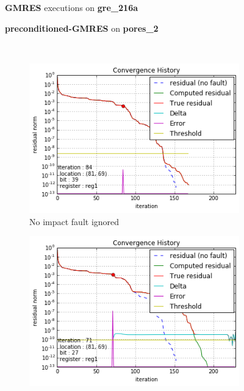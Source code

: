 \begin{figure}[h]
	\centering
    
\begin{minipage}[b]{0.45\linewidth}
\centering
\textbf{GMRES} executions on \textbf{gre_216a} 
\end{minipage}
\quad
\begin{minipage}{0.45\linewidth}
\centering
\textbf{preconditioned-GMRES} on \textbf{pores_2}
\end{minipage}\\


    \begin{minipage}[b]{0.48\linewidth}
	
	\begin{subfigure}[t]{\linewidth}
		\centering
		\includegraphics[width=\linewidth]{figures/gre_216a/convergence_history_theoretical_detection_1_1.png}
		\caption{No impact fault ignored}\label{fig:gre_216a_conv_hist_theoretical_detection_0}
	\end{subfigure}
    \quad
    \begin{subfigure}[t]{\linewidth}
		\centering
		\includegraphics[width=\linewidth]{figures/gre_216a/convergence_history_theoretical_detection_0_1.png}

\end{subfigure}
\end{minipage}
\end{figure}
